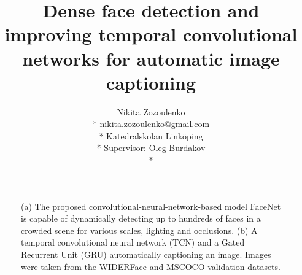 \documentclass[a4paper, twoside]{article}
\title{Dense face detection and improving temporal convolutional networks for automatic image captioning}
\author{Nikita Zozoulenko \\*
nikita.zozoulenko@gmail.com \\*
Katedralskolan Linköping\\*
Supervisor: Oleg Burdakov \\*}
\begin{document}
\maketitle

\vfill
\begin{figure}[h]
    \centering
  	\caption{(a) The proposed convolutional-neural-network-based model FaceNet is capable of dynamically detecting up to hundreds of faces in a crowded scene for various scales, lighting and occlusions. (b) A temporal convolutional neural network (TCN) and a Gated Recurrent Unit (GRU) automatically captioning an image. Images were taken from the WIDERFace \cite{WIDERFace} and MSCOCO \cite{mscoco} validation datasets.} \label{figtitle}
\end{figure}
\vfill
\end{document}
